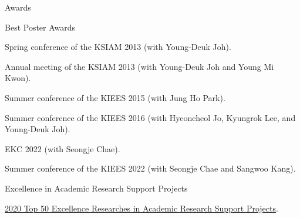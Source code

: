 \documentclass{resume} %
\begin{document}
\begin{rSection}{Awards}
\begin{rSubsection}{Best Poster Awards}{}{}{}
\item Spring conference of the KSIAM 2013 (with Young-Deuk Joh).%
\item Annual meeting of the KSIAM 2013 (with Young-Deuk Joh and Young Mi Kwon).%
\item Summer conference of the KIEES 2015 (with Jung Ho Park).%
\item Summer conference of the KIEES 2016 (with Hyeoncheol Jo, Kyungrok Lee, and Young-Deuk Joh).%
\item EKC 2022 (with Seongje Chae).
\item Summer conference of the KIEES 2022 (with Seongje Chae and Sangwoo Kang).%
\end{rSubsection}

\begin{rSubsection}{Excellence in Academic Research Support Projects}{}{}{}
\item \href{https://moe.go.kr/boardCnts/view.do?boardID=333&boardSeq=83054&lev=0&searchType=null&statusYN=W&page=1&s=moe&m=0501&opType=N}{2020 Top 50 Excellence Researches in Academic Research Support Projects}.
\end{rSubsection}

\end{rSection}

\end{document}
